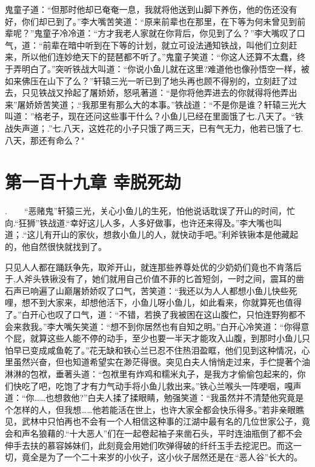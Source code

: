 \documentclass[12pt,oneside]{book}
\begin{document}
鬼童子道：``但那时他却已奄奄一息，我就将他送到山脚下养伤，他的伤还没有好，你们却已到了。''李大嘴苦笑道：``原来前辈也在那里，在下等为何未曾见到前辈呢？''鬼童子冷冷道：``方才我老人家就在你背后，你见到了么？''李大嘴叹了口气，道：``前辈在暗中听到在下等的计划，就立可设法通知铁战，叫他们立刻赶来，所以他们连妙绝天下的琵琶都不听了。''鬼童子笑道：``你这人还算不太蠢，终于弄明白了。''突听铁战大叫道：``你说小鱼儿就在这里?难道他也像孙悟空一样，被如来佛压在山下了么？''轩辕三光一听已到了地头再也顾不得别的，立刻赶了过去，只见铁战又拎起了屠娇娇，怒吼著道：``是你将他弄进去的你就得将他弄出来''屠娇娇苦笑道；.``我那里有那么大的本事。''铁战道：``不是你是谁？轩辕三光大叫道：''格老子，现在还问这些事干什么？小鱼儿已经在里面饿了七.八天了。``铁战失声道；.''七.八天，这姓花的小子只饿了两三天，已有气无力，他若已饿了七.八天，那还有命么？"

\hypertarget{ux7b2cux4e00ux767eux5341ux4e5dux7ae0-ux5e78ux8131ux6b7bux52ab}{%
\chapter{第一百十九章
幸脱死劫}\label{ux7b2cux4e00ux767eux5341ux4e5dux7ae0-ux5e78ux8131ux6b7bux52ab}}

.　　``恶赌鬼''轩猿三光，关心小鱼儿的生死，怕他说话耽误了开山的时间，忙向.``狂狮''铁战道.``幸好这儿人多，人多好做事，也许还来得及。''李大嘴也叫道；.``这儿有开山的家伙，想救小鱼儿的人，就快动手吧。''利斧铁锹本是他藏起的，他自然很快就找到了。

只见人人都在踊跃争先，取斧开山，就连那些养尊处优的少奶奶们竟也不肯落后于,人斧头铁锹没有了，她们就用自己价值不菲的匕首短剑，一时之间，震耳的凿石声已响遍了山巅屠娇娇叹了口气，苦笑道：``我还以为人人都想小鱼儿快些死哩，想不到大家来，却想他活下，小鱼儿呀小鱼儿，如此看来，你就算死也值得了。''白开心也叹了口气，道：``不错，若换了我被困在这山腹伫，只怕连野狗都不会来救我。''李大嘴矢笑道：``想不到你居然也有自知之明。''白开心冷笑道：``你得意个屁，就算这些人能不停的动手，至少也要一半天才能攻入山腹，到那时小鱼儿只怕早已变成咸鱼乾了。''花无缺和铁心兰已忍不住热泪盈眶，他们见到这种情况，心里虽然兴奋，但也知道希望实在渺茫得很。突见白夫人悄悄走过来，手伫提著个油淋淋的包袱，垂著头道：``包袱里有炸鸡和糯米丸子，是我方才偷偷包起来的，你们快吃了吧，吃饱了才有力气动手将小鱼儿救出来。''铁心兰喉头一阵哽咽，嘎声道：``你\ldots\ldots 也想救他?''白夫人揉了揉眼睛，勉强笑道：``我虽然并不清楚他究竟是个怎样的人，但我想\ldots\ldots 他若能活在世上，也许大家全都会快乐得多。''若非亲眼瞧见，武林中只怕再也不会有一个人相信这种事的江湖中最有名的几位世家公子，竟会和声名狼藉的.``十大恶人''们在一起卷起袖子来凿石头，平时连油瓶倒了都不会伸手去扶的慕容姊妹们，此刻竟会用她们吹弹得破的纤纤玉手去挖泥巴。而这一切，竟全是为了一个二十来岁的小伙子，这小伙子居然还是在.``恶人谷''长大的。
\end{document}
